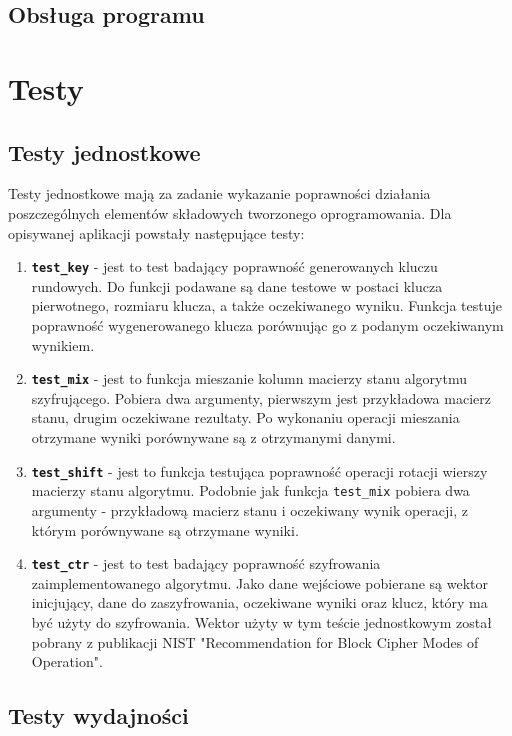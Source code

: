 \documentclass[a4paper,12pt]{article}
\begin{document}
\subsection{Obsługa programu}

\section{Testy}

\subsection{Testy jednostkowe}

Testy jednostkowe mają za zadanie wykazanie poprawności działania poszczególnych elementów składowych tworzonego oprogramowania.  Dla opisywanej aplikacji powstały następujące testy:
\begin{enumerate}
\item \textbf{\texttt{test\_key}} - jest to test badający poprawność generowanych kluczu rundowych. Do funkcji podawane są dane testowe w postaci klucza pierwotnego, rozmiaru klucza, a także oczekiwanego wyniku. Funkcja testuje poprawność wygenerowanego klucza porównując go z podanym oczekiwanym wynikiem.
\item \textbf{\texttt{test\_mix}} - jest to funkcja mieszanie kolumn macierzy stanu algorytmu szyfrującego. Pobiera dwa argumenty, pierwszym jest przykładowa macierz stanu, drugim oczekiwane rezultaty. Po wykonaniu operacji mieszania otrzymane wyniki porównywane są z otrzymanymi danymi.
\item \textbf{\texttt{test\_shift}} - jest to funkcja testująca poprawność operacji rotacji wierszy macierzy stanu algorytmu. Podobnie jak funkcja \texttt{test\_mix} pobiera dwa argumenty - przykładową macierz stanu i oczekiwany wynik operacji, z którym porównywane są otrzymane wyniki.
\item \textbf{\texttt{test\_ctr}} - jest to test badający poprawność szyfrowania zaimplementowanego algorytmu. Jako dane wejściowe pobierane są wektor inicjujący, dane do zaszyfrowania, oczekiwane wyniki oraz klucz, który ma być użyty do szyfrowania. Wektor użyty w tym teście jednostkowym został pobrany z publikacji NIST "Recommendation for Block Cipher Modes of Operation".
\end{enumerate}

\subsection{Testy wydajności}
\end{document}

